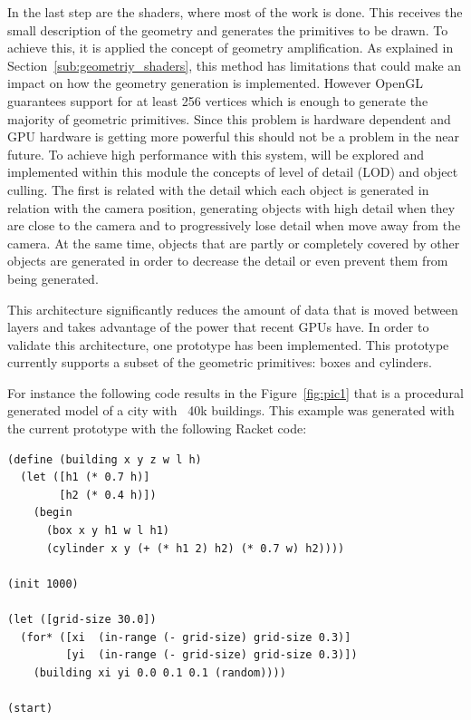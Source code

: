 In the last step are the shaders, where most of the work is done. This receives the small description of the geometry and generates the primitives to be
drawn. To achieve this, it is applied the concept of geometry amplification. As explained in Section~\ref{sub:geometriy_shaders}, this method has
limitations that could make an impact on how the geometry generation is implemented. However OpenGL guarantees support for at least 256 vertices which
is enough to generate the majority of geometric primitives. Since this problem is hardware dependent and GPU hardware is getting more powerful this
should not be a problem in the near future. 
To achieve high performance with this system, will be explored and implemented within this module the concepts of level of detail (LOD) and object
culling. The first is related with the detail which each object is generated in relation with the camera position, generating  objects with high detail
when they are close to the camera and to progressively lose detail when move away from the camera.  At the same time, objects that are partly or
completely covered by other objects are generated in order to decrease the detail or even prevent them from being generated.

This architecture significantly reduces the amount of data that is moved between layers and takes advantage of the power that recent GPUs have. 
In order to validate this architecture, one prototype has been implemented. This prototype currently supports a subset of the geometric primitives: boxes and cylinders.

For instance the following code results in the Figure~\ref{fig:pic1} that is a procedural generated model of a city with ~40k buildings. This example
was generated with the current prototype with the following Racket code:



\lstset{style=racket}
\begin{lstlisting}
(define (building x y z w l h)
  (let ([h1 (* 0.7 h)]
        [h2 (* 0.4 h)])
    (begin
      (box x y h1 w l h1)
      (cylinder x y (+ (* h1 2) h2) (* 0.7 w) h2))))

(init 1000)

(let ([grid-size 30.0])
  (for* ([xi  (in-range (- grid-size) grid-size 0.3)]
         [yi  (in-range (- grid-size) grid-size 0.3)])
    (building xi yi 0.0 0.1 0.1 (random))))

(start)
\end{lstlisting}

